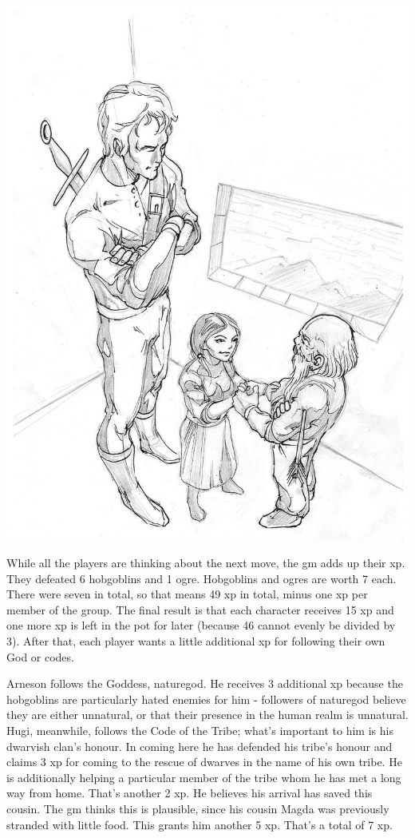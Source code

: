 \begin{multicols}{2}
{\begin{exampletext}
\includegraphics[width=\linewidth]{images/Boris_Pecikozic/dwarves_meet.jpg}
\label{boris:meet}

While all the players are thinking about the next move, the \gls{gm} adds up their \gls{xp}. They defeated 6 hobgoblins and 1 ogre. Hobgoblins and ogres are worth 7 each. There were seven in total, so that means 49 \gls{xp} in total, minus one \gls{xp} per member of the group. The final result is that each character receives 15 \gls{xp} and one more \gls{xp} is left in the pot for later (because 46 cannot evenly be divided by 3). After that, each player wants a little additional \gls{xp} for following their own God or codes.

Arneson follows the Goddess, \gls{naturegod}.
He receives 3 additional \gls{xp} because the hobgoblins are particularly hated enemies for him - followers of \gls{naturegod} believe they are either unnatural, or that their presence in the human realm is unnatural.
Hugi, meanwhile, follows the Code of the Tribe; what's important to him is his dwarvish clan's honour.
In coming here he has defended his tribe's honour and claims 3 \gls{xp} for coming to the rescue of dwarves in the name of his own tribe.
He is additionally helping a particular member of the tribe whom he has met a long way from home.
That's another 2 \gls{xp}.
He believes his arrival has saved this cousin.
The \gls{gm} thinks this is plausible, since his cousin Magda was previously stranded with little food.
This grants him another 5 \gls{xp}.
That's a total of 7 \gls{xp}.


\end{exampletext}}
\end{multicols}
